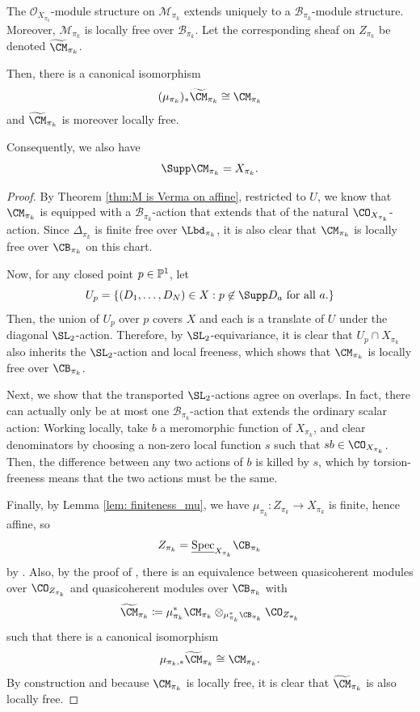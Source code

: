 \documentclass[11pt,reqno]{amsart}
\begin{document}
\begin{proposition}\label{prop:Mpi-pushforward} The $\mathcal{O}_{X_{\pi_k}}$-module structure on $\mathcal{M}_{\pi_k}$ extends uniquely to a $\mathcal{B}_{\pi_k}$-module structure. Moreover, $\mathcal{M}_{\pi_k}$ is locally free over $\mathcal{B}_{\pi_k}$. Let the corresponding sheaf on $Z_{\pi_k}$ be denoted $\widetilde{\CM}_{\pi_k}$. 

Then, there is a canonical isomorphism \[(\mu_{\pi_k})_*\widetilde{\CM}_{\pi_k}\cong \CM_{\pi_k}\] and $\mathcal{\widetilde{\CM}}_{\pi_k}$ is moreover locally free.

Consequently, we also have \[\Supp \CM_{\pi_k} = X_{\pi_k}.\]
\end{proposition}
\begin{proof}
    By Theorem \ref{thm:M is Verma on affine}, restricted to $U$, we know that $\CM_{\pi_k}$ is equipped with a $\mathcal{B}_{\pi_k}$-action that extends that of the natural $\CO_{X_{\pi_k}}$-action. Since $\Delta_{\pi_k}$ is finite free over $\Lbd_{\pi_k}$, it is also clear that $\CM_{\pi_k}$ is locally free over $\CB_{\pi_k}$ on this chart. 

    Now, for any closed point $p\in\mathbb P^1$, let \[U_p=\{(D_1,\ldots, D_N)\in X : p\not\in \Supp D_a \text{ for all }a.\}\] Then, the union of $U_p$ over $p$ covers $X$ and each is a translate of $U$ under the diagonal $\SL_2$-action. Therefore, by $\SL_2$-equivariance, it is clear that $U_p\cap X_{\pi_k}$ also inherits the $\SL_2$-action and local freeness, which shows that $\CM_{\pi_k}$ is locally free over $\CB_{\pi_k}$.

    Next, we show that the transported $\SL_2$-actions agree on overlaps. In fact, there can actually only be at most one $\mathcal{B}_{\pi_k}$-action that extends the ordinary scalar action: Working locally, take $b$ a meromorphic function of $X_{\pi_k}$, and clear denominators by choosing a non-zero local function $s$ such that $sb\in \CO_{X_{\pi_k}}$. Then, the difference between any two actions of $b$ is killed by $s$, which by torsion-freeness means that the two actions must be the same. 

    Finally, by Lemma \ref{lem: finiteness_mu}, we have $\mu_{\pi_k}\colon Z_{\pi_k}\to X_{\pi_k}$ is finite, hence affine, so \[Z_{\pi_k} = \underline{\Spec}_{X_{\pi_k}}\CB_{\pi_k}\]by \cite[Tag 01S8]{stacks}. Also, by the proof of \cite[Tag 01SB]{stacks}, there is an equivalence between quasicoherent modules over $\CO_{Z_{\pi_k}}$ and quasicoherent modules over $\CB_{\pi_k}$ with \[\widetilde{\CM}_{\pi_k}\coloneqq \mu_{\pi_k}^*\CM_{\pi_k}
\otimes_{\mu_{\pi_k}^*\CB_{\pi_k}}
\CO_{Z_{\pi_k}}\] such that there is a canonical isomorphism \[\mu_{\pi_k,*}\widetilde{\CM}_{\pi_k}\cong \CM_{\pi_k}.\] By construction and because $\CM_{\pi_k}$ is locally free, it is clear that $\widetilde{\CM}_{\pi_k}$ is also locally free. 
\end{proof}
\end{document}
